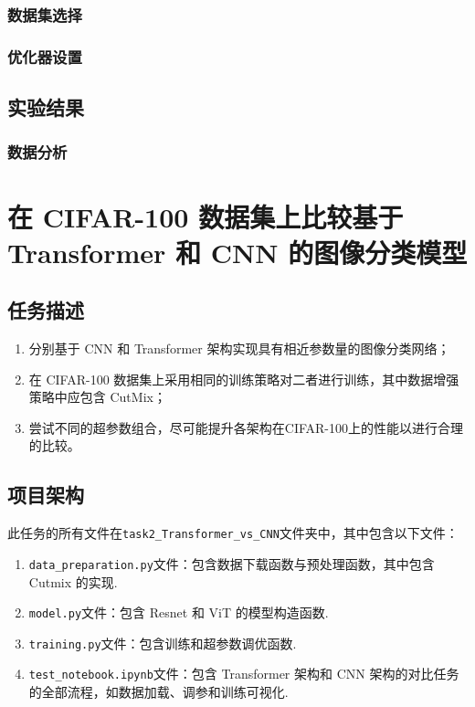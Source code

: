 \documentclass[notitlepage,cs4size,punct,oneside]{ctexrep}
\numberwithin{equation}{chapter}
\theoremstyle{mystyle}
\begin{document}
\subsection{数据集选择}

\subsection{优化器设置}

\section{实验结果}
\subsection{数据分析}

\chapter{在 CIFAR-100 数据集上比较基于 Transformer 和 CNN 的图像分类模型}
\section{任务描述}
\begin{enumerate}
\item 分别基于 CNN 和 Transformer 架构实现具有相近参数量的图像分类网络；
\item 在 CIFAR-100 数据集上采用相同的训练策略对二者进行训练，其中数据增强策略中应包含 CutMix；
\item 尝试不同的超参数组合，尽可能提升各架构在CIFAR-100上的性能以进行合理的比较。
\end{enumerate}


\section{项目架构}
此任务的所有文件在\texttt{task2\_Transformer\_vs\_CNN}文件夹中，其中包含以下文件：
\begin{enumerate}
\item \texttt{data\_preparation.py}文件：包含数据下载函数与预处理函数，其中包含 Cutmix 的实现.
\item \texttt{model.py}文件：包含 Resnet 和 ViT 的模型构造函数.
\item \texttt{training.py}文件：包含训练和超参数调优函数.
\item \texttt{test\_notebook.ipynb}文件：包含 Transformer 架构和 CNN 架构的对比任务的全部流程，如数据加载、调参和训练可视化.
\end{enumerate}
\end{document}
